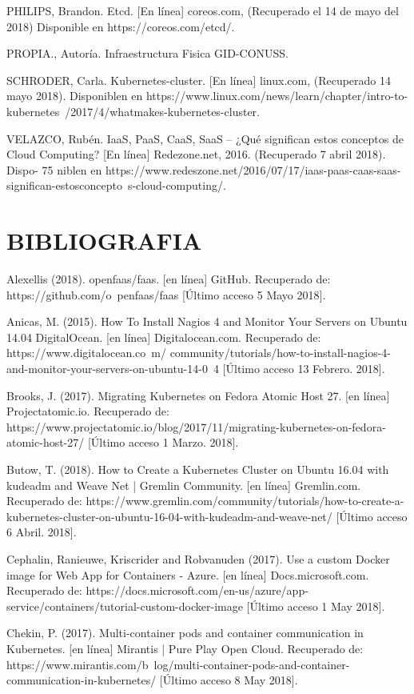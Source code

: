 PHILIPS, Brandon. Etcd. [En línea] coreos.com, (Recuperado el 14 de mayo del 2018) Disponible en https://coreos.com/etcd/. 

PROPIA., Autoría. Infraestructura Fisica GID-CONUSS. 

SCHRODER, Carla. Kubernetes-cluster. [En línea] linux.com, (Recuperado 14 mayo 2018). Disponiblen en https://www.linux.com/news/learn/chapter/intro-to-kubernetes\ /2017/4/whatmakes-kubernetes-cluster. 

VELAZCO, Rubén. IaaS, PaaS, CaaS, SaaS – ¿Qué significan estos conceptos de Cloud Computing? [En línea] Redezone.net, 2016. (Recuperado 7 abril 2018). Dispo- 75 niblen en https://www.redeszone.net/2016/07/17/iaas-paas-caas-saas-significan-estosconcepto\ s-cloud-computing/.

    
     \newpage\chapter{BIBLIOGRAFIA}
     
     Alexellis (2018). openfaas/faas. [en línea] GitHub. Recuperado de: https://github.com/o\ penfaas/faas [Último acceso 5 Mayo 2018].
     
     Anicas, M. (2015). How To Install Nagios 4 and Monitor Your Servers on Ubuntu 14.04 DigitalOcean. [en línea] Digitalocean.com. Recuperado de: https://www.digitalocean.co\ m/
community/tutorials/how-to-install-nagios-4-and-monitor-your-servers-on-ubuntu-14-0\ 4 [Último acceso 13 Febrero. 2018].

Brooks, J. (2017). Migrating Kubernetes on Fedora Atomic Host 27. [en línea] Projectatomic.io. Recuperado de: https://www.projectatomic.io/blog/2017/11/migrating-kubernetes-on-fedora-atomic-host-27/ [Último acceso 1 Marzo. 2018].

Butow, T. (2018). How to Create a Kubernetes Cluster on Ubuntu 16.04 with kudeadm and Weave Net | Gremlin Community. [en línea] Gremlin.com. Recuperado de: https://www.gremlin.com/community/tutorials/how-to-create-a-kubernetes-cluster-on-ubuntu-16-04-with-kudeadm-and-weave-net/ [Último acceso 6 Abril. 2018].

Cephalin, Ranieuwe, Kriscrider and Robvanuden (2017). Use a custom Docker image for Web App for Containers - Azure. [en línea] Docs.microsoft.com. Recuperado de: https://docs.microsoft.com/en-us/azure/app-service/containers/tutorial-custom-docker-image [Último acceso 1 May 2018].

Chekin, P. (2017). Multi-container pods and container communication in Kubernetes. [en línea] Mirantis | Pure Play Open Cloud. Recuperado de: https://www.mirantis.com/b\ log/multi-container-pods-and-container-communication-in-kubernetes/ [Último acceso 8 May 2018].


